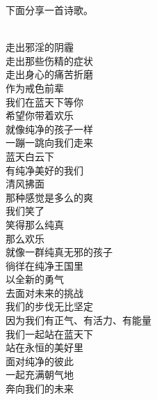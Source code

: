 下面分享一首诗歌。

\begin{poem}[我们在蓝天下等你]
    \begin{multicols}{2}
        \begin{center}~\\
            走出邪淫的阴霾 \\ 走出那些伤精的症状 \\ 走出身心的痛苦折磨 \\ 作为戒色前辈 \\ 我们在蓝天下等你 \\ 希望你带着欢乐 \\ 就像纯净的孩子一样 \\ 一蹦一跳向我们走来 \\ 蓝天白云下 \\ 有纯净美好的我们 \\ 清风拂面 \\ 那种感觉是多么的爽 \\ 我们笑了 \\ 笑得那么纯真 \\ 那么欢乐 \\ 就像一群纯真无邪的孩子 \\ 徜徉在纯净王国里 \\ 以全新的勇气 \\ 去面对未来的挑战 \\ 我们的步伐无比坚定 \\ 因为我们有正气、有活力、有能量 \\ 我们一起站在蓝天下 \\ 站在永恒的美好里 \\ 面对纯净的彼此 \\ 一起充满朝气地 \\ 奔向我们的未来
        \end{center}
    \end{multicols}
\end{poem}
